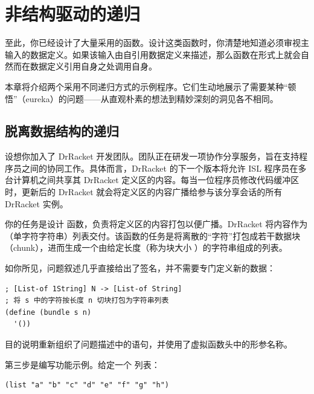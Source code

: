 
\chapter{非结构驱动的递归}
\label{sec:ch25_nonstandard}

至此，你已经设计了大量采用的函数。设计这类函数时，你清楚地知道必须审视主输入的数据定义。如果该输入由自引用数据定义来描述，那么函数在形式上就会自然而在数据定义引用自身之处调用自身。

本章将介绍两个采用不同递归方式的示例程序。它们生动地展示了需要某种“顿悟”（eureka）的问题——从直观朴素的想法到精妙深刻的洞见各不相同。

\section{脱离数据结构的递归}
\label{sec:25_1}

设想你加入了 DrRacket 开发团队。团队正在研发一项协作分享服务，旨在支持程序员之间的协同工作。具体而言，DrRacket 的下一个版本将允许 ISL 程序员在多台计算机之间共享其 DrRacket 定义区的内容。每当一位程序员修改代码缓冲区时，更新后的 DrRacket 就会将定义区的内容广播给参与该分享会话的所有 DrRacket 实例。

\begin{notebox}[样例问题]
你的任务是设计  函数，负责将定义区的内容打包以便广播。DrRacket 将内容作为 （单字符字符串）列表交付。该函数的任务是将离散的“字符”打包成若干数据块（chunk），进而生成一个由给定长度（称为块大小 ）的字符串组成的列表。
\end{notebox}

如你所见，问题叙述几乎直接给出了签名，并不需要专门定义新的数据：

\begin{lstlisting}[language=BSL]
; [List-of 1String] N -> [List-of String]
; 将 s 中的字符按长度 n 切块打包为字符串列表
(define (bundle s n)
  '())
\end{lstlisting}

目的说明重新组织了问题描述中的语句，并使用了虚拟函数头中的形参名称。

第三步是编写功能示例。给定一个  列表：

\begin{lstlisting}[language=BSL]
(list "a" "b" "c" "d" "e" "f" "g" "h")
\end{lstlisting}

